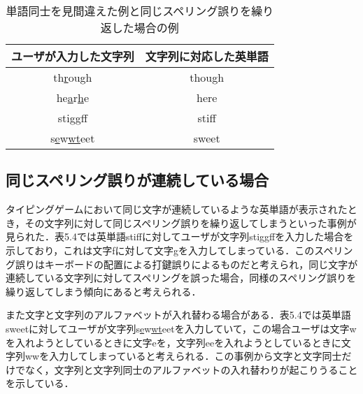  \begin{table*}[!t]
  \small
  \begin{center}
   \caption{単語同士を見間違えた例と同じスペリング誤りを繰り返した場合の例}
   \begin{tabular}{|c|c|} \hline
       	ユーザが入力した文字列 & 文字列に対応した英単語\\ \hline
	    th\underline{r}ough & though\\ \hline
	    he\underline{a}r\underline{h}e & here\\ \hline
	    sti\underline{gg}ff & stiff\\ \hline
	    s\underline{e}w\underline{wt}eet & sweet\\ \hline
   \end{tabular}
  \end{center}
 \end{table*}

\subsection{同じスペリング誤りが連続している場合}
タイピングゲームにおいて同じ文字が連続しているような英単語が表示されたとき，その文字列に対して同じスペリング誤りを繰り返してしまうといった事例が見られた．表5.4では英単語stiffに対してユーザが文字列sti\underline{gg}ffを入力した場合を示しており，これは文字fに対して文字gを入力してしまっている．このスペリング誤りはキーボードの配置による打鍵誤りによるものだと考えられ，同じ文字が連続している文字列に対してスペリングを誤った場合，同様のスペリング誤りを繰り返してしまう傾向にあると考えられる．

また文字と文字列のアルファベットが入れ替わる場合がある．表5.4では英単語sweetに対してユーザが文字列s\underline{e}w\underline{wt}eetを入力していて，この場合ユーザは文字wを入れようとしているときに文字eを，文字列eeを入れようとしているときに文字列wwを入力してしまっていると考えられる．この事例から文字と文字同士だけでなく，文字列と文字列同士のアルファベットの入れ替わりが起こりうることを示している．
